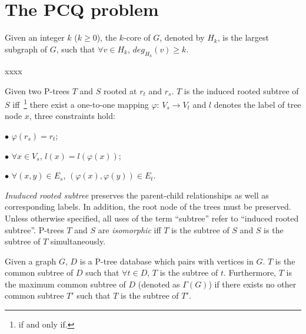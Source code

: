 \clearpage
\section{The PCQ problem}
\label{PCQproblem}




\begin{definition}
\label{def:kcore}
Given an integer $k$ ($k\geq 0$), the $k$-core of $G$,
denoted by $H_{k}$, is the largest subgraph of $G$, such that $\forall v \in H_k$, $deg_{H_k}(v) \geq k$.
\end{definition}

\begin{definition}
xxxx
\end{definition}

\begin{definition}
Given two P-trees $T$ and $S$ rooted at $r_t$ and $r_s$. $T$ is the induced rooted subtree of $S$ iff~\footnote{if and only if.} there exist a one-to-one mapping $\varphi$: $V_s \to V_t$ and $l$ denotes the label of tree node $x$, three constraints hold:

\vspace{1ex}

$\bullet$ $\varphi(r_s)=r_t$;

$\bullet$ $\forall x \in V_s$, $l(x)=l(\varphi(x))$;

$\bullet$ $\forall (x,y) \in E_s$, $(\varphi(x),\varphi(y)) \in E_t$. 
\end{definition}

{\it Inuduced rooted subtree} preserves the parent-child relationships as well as corresponding labels. In addition, the root node of the trees must be preserved. Unless otherwise specified, all uses of the term ``subtree'' refer to ``induced rooted subtree''. P-trees $T$ and $S$ are {\it isomorphic} iff $T$ is the subtree of $S$ and $S$ is the subtree of $T$ simultaneously.


\begin{definition}
Given a graph $G$, $D$ is a P-tree database which pairs with vertices in $G$. $T$ is the common subtree of $D$ such that $\forall t \in D$, $T$ is the subtree of $t$. Furthermore, $T$ is the maximum common subtree of $D$ (denoted as $\Gamma(G)$) if there exists no other common subtree $T'$ such that $T$ is the subtree of $T'$. 

\end{definition}



